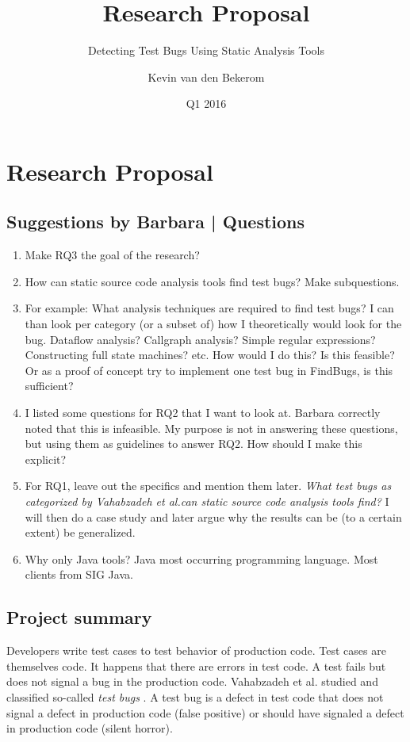 \documentclass{uvamscse}
\title{Research Proposal}
\subtitle{Detecting Test Bugs Using Static Analysis Tools}
\date{Q1 2016}
\author{Kevin van den Bekerom}
\newcommand{\Atestbugs}{Vahabzadeh et al.}
\begin{document}
\maketitle

\chapter{Research Proposal}

\section*{Suggestions by Barbara | Questions}
\begin{enumerate}
	\item Make RQ3 the goal of the research?
	\item How can static source code analysis tools find test bugs? Make subquestions. 
	\item For example: What analysis techniques are required to find test bugs? I can than look per category (or a subset of) how I theoretically would look for the bug. Dataflow analysis? Callgraph analysis? Simple regular expressions? Constructing full state machines? etc. How would I do this? Is this feasible? Or as a proof of concept try to implement one test bug in FindBugs, is this sufficient? 
	\item I listed some questions for RQ2 that I want to look at. Barbara correctly noted that this is infeasible. My purpose is not in answering these questions, but using them as guidelines to answer RQ2. How should I make this explicit?
	\item For RQ1, leave out the specifics and mention them later. \textit{What test bugs as categorized by \Atestbugs can static source code analysis tools find? } I will then do a case study and later argue why the results can be (to a certain extent) be generalized.
	\item Why only Java tools? Java most occurring programming language. Most clients from SIG Java.
\end{enumerate}

\section{Project summary}
Developers write test cases to test behavior of production code. Test cases are themselves code. It happens that there are errors in test code. A test fails but does not signal a bug in the production code. \Atestbugs{} studied and classified so-called \textit{test bugs} \cite{vahabzadeh2015empirical}. A test bug is a defect in test code that does not signal a defect in production code (false positive) or should have signaled a defect in production code (silent horror).
\end{document}

